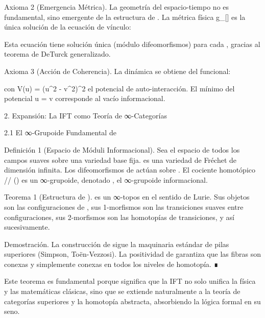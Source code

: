 \documentclass[12pt,a4paper]{book}
\begin{document}
Axioma 2 (Emergencia Métrica). La geometría del espacio-tiempo no es fundamental, sino emergente de la estructura de  \rho . La métrica física  g_{\mu\nu}[\rho]  es la única solución de la ecuación de vínculo:


Esta ecuación tiene solución única (módulo difeomorfismos) para cada  \rho , gracias al teorema de DeTurck generalizado.

Axioma 3 (Acción de Coherencia). La dinámica se obtiene del funcional:


con  V(u) = (u^2 - v^2)^2  el potencial de auto-interacción. El mínimo del potencial  u = v  corresponde al vacío informacional.

2. Expansión: La IFT como Teoría de ∞-Categorías

2.1 El ∞-Grupoide Fundamental de  \rho 

Definición 1 (Espacio de Móduli Informacional). Sea    el espacio de todos los campos  \rho  suaves sobre una variedad base    fija.    es una variedad de Fréchet de dimensión infinita. Los difeomorfismos de    actúan sobre   . El cociente homotópico   /\!/ ()  es un ∞-grupoide, denotado   , el ∞-grupoide informacional.

Teorema 1 (Estructura de   ).    es un ∞-topos en el sentido de Lurie. Sus objetos son las configuraciones de  \rho , sus 1-morfismos son las transiciones suaves entre configuraciones, sus 2-morfismos son las homotopías de transiciones, y así sucesivamente.

Demostración. La construcción de    sigue la maquinaria estándar de pilas superiores (Simpson, Toën-Vezzosi). La positividad de  \rho  garantiza que las fibras son conexas y simplemente conexas en todos los niveles de homotopía. ∎

Este teorema es fundamental porque significa que la IFT no solo unifica la física y las matemáticas clásicas, sino que se extiende naturalmente a la teoría de categorías superiores y la homotopía abstracta, absorbiendo la lógica formal en su seno.
\end{document}
